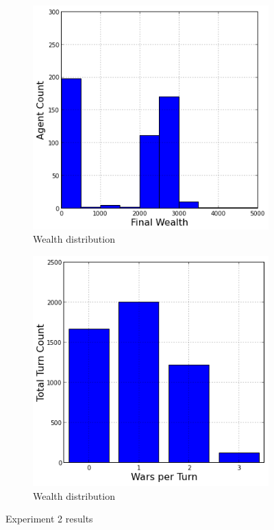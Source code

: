 \documentclass{article}
\begin{document}
\begin{figure}[h!]
	\centering
	\begin{subfigure}{0.49\textwidth}
		\includegraphics[width=\textwidth]{Graphics/Exp2WealthDistribution}
		\caption{Wealth distribution}
	\end{subfigure}
	\begin{subfigure}{0.49\textwidth}
		\includegraphics[width=\textwidth]{Graphics/Exp2WarDistribution}
		\caption{Wealth distribution}
	\end{subfigure}
\caption{Experiment 2 results}
\end{figure}
\end{document}
